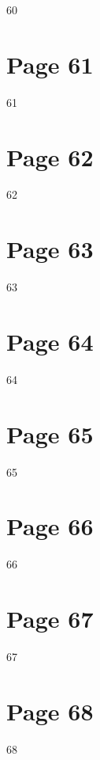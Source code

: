\documentclass{article}
\begin{document}
 
 60  
 


\section*{Page 61}
   
 
 61  
 


\section*{Page 62}
   
 
 62  
 


\section*{Page 63}
   
 
 63  
 


\section*{Page 64}
   
 
 64  
 


\section*{Page 65}
   
 
 65  
 


\section*{Page 66}
   
 
 66  
 


\section*{Page 67}
   
 
 67  
 


\section*{Page 68}
   
 
 68  
 
\end{document}
